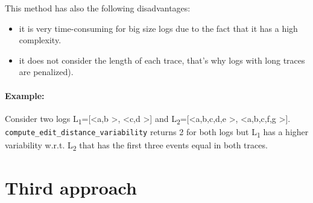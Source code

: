 \documentclass[12pt]{article}
\begin{document}
This method has also the following disadvantages:
\begin{itemize}
	\item it is very time-consuming for big size logs due to the fact that it has a high complexity.
	\item it does not consider the length of each trace, that's why logs with long traces are penalized).\label{ref1}
\end{itemize}  

\paragraph*{Example:} Consider two logs L\textsubscript{1}=[\textless a,b \textgreater, \textless c,d \textgreater] and L\textsubscript{2}=[\textless a,b,c,d,e \textgreater, \textless a,b,c,f,g \textgreater]. \texttt{compute\_edit\_distance\_variability} returns 2 for both logs but L\textsubscript{1} has a higher variability w.r.t. L\textsubscript{2} that has the first three events equal in both traces. 


\section*{Third approach}
\end{document}
